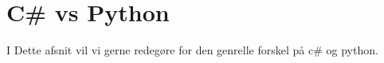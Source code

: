 \documentclass[class=report, crop=false]{standalone}
\begin{document}
    \section{C\# vs Python}
        I Dette afsnit vil vi gerne redegøre for den genrelle forskel på c\# og python. 
    
\end{document}
